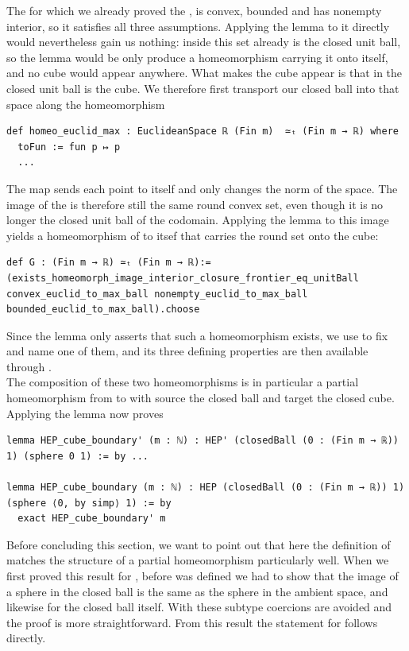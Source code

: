 \documentclass[11pt, a4paper, english]{article}
\theoremstyle{plain}
\theoremstyle{definition}
\theoremstyle{remark}
\numberwithin{equation}{section}
\numberwithin{theorem}{section}
\begin{document}
The  for which we already proved the , is convex, bounded and has nonempty interior, so it satisfies all three assumptions. Applying the lemma to it directly would nevertheless gain us nothing: inside  this set already is the closed unit ball, so the lemma would be only produce a homeomorphism carrying it onto itself, and no cube would appear anywhere. What makes the cube appear is that in  the closed unit ball is the cube. We therefore first transport our closed ball into that space along the homeomorphism 
\begin{verbatim}
def homeo_euclid_max : EuclideanSpace ℝ (Fin m)  ≃ₜ (Fin m → ℝ) where
  toFun := fun p ↦ p
  ...
\end{verbatim}
The map  sends each point to itself and only changes the norm of the space. The image of the  is therefore still the same round convex set, even though it is no longer the closed unit ball of the codomain. Applying the lemma to this image yields a homeomorphism of  to itsef that carries the round set onto the cube: 

\begin{verbatim}
def G : (Fin m → ℝ) ≃ₜ (Fin m → ℝ):= (exists_homeomorph_image_interior_closure_frontier_eq_unitBall convex_euclid_to_max_ball nonempty_euclid_to_max_ball bounded_euclid_to_max_ball).choose
\end{verbatim}

Since the lemma only asserts that such a homeomorphism exists, we use  to fix and name one of them, and its three defining properties are then available through . \\
The composition of these two homeomorphisms is in particular a partial homeomorphism from  to  with source the closed ball and target the closed cube. Applying the lemma  now proves 
\begin{verbatim}
lemma HEP_cube_boundary' (m : ℕ) : HEP' (closedBall (0 : (Fin m → ℝ)) 1) (sphere 0 1) := by ...

lemma HEP_cube_boundary (m : ℕ) : HEP (closedBall (0 : (Fin m → ℝ)) 1) (sphere ⟨0, by simp⟩ 1) := by
  exact HEP_cube_boundary' m
\end{verbatim}

Before concluding this section, we want to point out that here the definition of  matches the structure of a partial homeomorphism particularly well. When we first proved this result for , before  was defined we had to show that the  image of a sphere in the closed ball is the same as the sphere in the ambient space, and likewise for the closed ball itself. With  these subtype coercions are avoided and the proof is more straightforward. From this result the statement for  follows directly.
\end{document}
